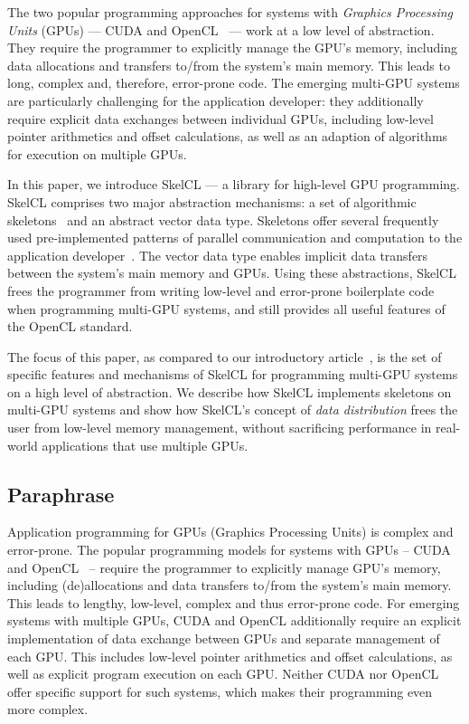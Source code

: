 The two popular programming approaches for systems with \emph{Graphics Processing Units} (GPUs) --- CUDA and OpenCL~\cite{OpenCL-11,CUDA-12,KiHw-10} --- work at a low level of abstraction.
They require the programmer to explicitly manage the GPU's memory, including data allocations and transfers to/from the system's main memory.
This leads to long, complex and, therefore, error-prone code.
The emerging multi-GPU systems are particularly challenging for the application developer:
they additionally require explicit data exchanges between individual GPUs, including low-level pointer arithmetics and offset calculations, as well as an adaption of algorithms for execution on multiple GPUs.

In this paper, we introduce SkelCL --- a library for high-level GPU programming.
SkelCL comprises two major abstraction mechanisms: a set of algorithmic skeletons~\cite{Cole-89} and an abstract vector data type.
Skeletons offer several frequently used pre-implemented patterns of parallel communication and computation to the application developer~\cite{RaG-03}.
The vector data type enables implicit data transfers between the system's main memory and GPUs.
Using these abstractions, SkelCL frees the programmer from writing low-level and error-prone boilerplate code when programming multi-GPU systems, and still provides all useful features of the OpenCL standard.

The focus of this paper, as compared to our introductory article~\cite{StKG-11}, is the set of specific features and mechanisms of SkelCL for programming multi-GPU systems on a high level of abstraction.
We describe how SkelCL implements skeletons on multi-GPU systems and show how SkelCL's concept of \emph{data distribution} frees the user from low-level memory management, without sacrificing performance in real-world applications that use multiple GPUs.


\subsection{Paraphrase}
Application programming for GPUs (Graphics Processing Units) is complex and error-prone.
The popular programming models for systems with GPUs -- CUDA and OpenCL~\cite{CUDA-12,KiHw-10,OpenCL-11} -- require the programmer to explicitly manage GPU's memory, including (de)allocations and data transfers to/from the system's main memory.
This leads to lengthy, low-level, complex and thus error-prone code.
For emerging systems with multiple GPUs, CUDA and OpenCL additionally require an explicit implementation of data exchange between GPUs and separate management of each GPU.
This includes low-level pointer arithmetics and offset calculations, as well as explicit program execution on each GPU.
Neither CUDA nor OpenCL offer specific support for such systems, which makes their programming even more complex.

